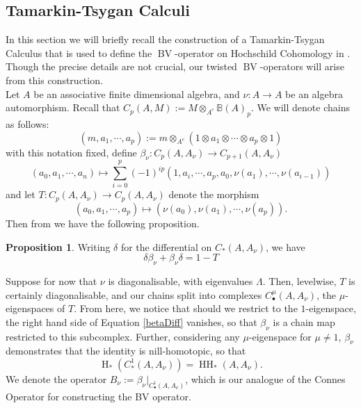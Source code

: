 \documentclass{article}
\newcommand{\HH}{\operatorname{HH}}
\newcommand{\bv}{\operatorname{BV}}
\theoremstyle{plain}
\theoremstyle{definition}
\newtheorem{proposition}[theorem]{Proposition}
\begin{document}
\subsection{Tamarkin-Tsygan Calculi} In this section we will briefly recall the construction of a Tamarkin-Tsygan Calculus that is used to define the $\bv$-operator on Hochschild Cohomology in \cite{Lambre}. Though the precise details are not crucial, our twisted $\bv$-operators will arise from this construction. \\[5pt]
Let $A$ be an associative finite dimensional algebra, and $\nu:A \rightarrow A$ be an algebra automorphism. Recall that $C_p(A, M):= M \otimes_{A^e} \mathbb{B}(A)_p$. We will denote chains as follows:
$$(m, a_1, \cdots, a_p) := m \otimes_{A^e} (1 \otimes a_1 \otimes \cdots \otimes a_p \otimes 1)$$
with this notation fixed, define  $\beta_\nu:C_p(A, A_\nu) \rightarrow C_{p+1}(A,A_\nu)$
$$(a_0, a_1, \cdots, a_n) \mapsto \sum_{i=0}^p (-1)^{ip} (1 , a_i , \cdots , a_p , a_0 , \nu(a_1) , \cdots , \nu(a_{i-1}))$$
and let $T:C_p(A, A_\nu) \rightarrow C_p(A, A_\nu)$ denote the morphism
$$(a_0, a_1, \cdots, a_p) \mapsto (\nu(a_0), \nu(a_1), \cdots, \nu(a_p)).$$
Then from \cite{Lambre} we have the following proposition.
\begin{proposition} Writing $\delta$ for the differential on $C_*(A, A_\nu)$, we have
\begin{equation}\label{betaDiff} \delta \beta_\nu + \beta_\nu \delta = 1-T \end{equation}
\end{proposition}
Suppose for now that $\nu$ is diagonalisable, with eigenvalues $\Lambda$. Then, levelwise, $T$ is certainly diagonalisable, and our chains split into complexes $C^\mu_\bullet(A,A_\nu)$, the $\mu$-eigenspaces of $T$. From here, we notice that should we restrict to the $1$-eigenspace, the right hand side of Equation \ref{betaDiff} vanishes, so that $\beta_\nu$ is a chain map restricted to this subcomplex. Further, considering any $\mu$-eigenspace for $\mu\not=1$, $\beta_\nu$ demonstrates that the identity is nill-homotopic, so that 
$$\operatorname{H}_*(C^1_*(A, A_\nu)) = \HH_*(A, A_\nu).$$
We denote the operator $B_\nu :=\beta_\nu|_{C^1_\bullet(A,A_\nu)}$, which is our analogue of the Connes Operator for constructing the BV operator. \\
\end{document}
